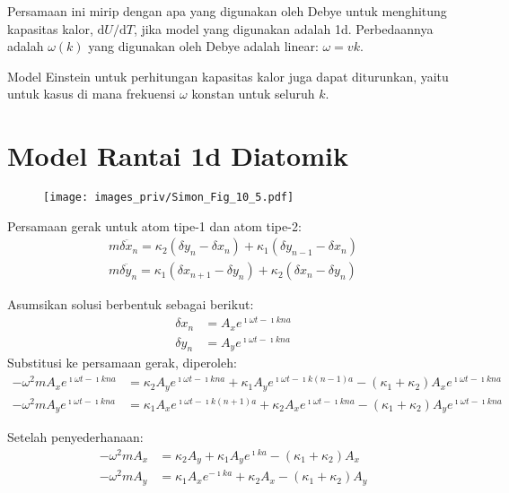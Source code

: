 Persamaan ini mirip dengan apa yang digunakan oleh Debye untuk
menghitung kapasitas kalor, $\mathrm{d}U/\mathrm{d}T$, jika model yang
digunakan adalah 1d. Perbedaannya adalah $\omega(k)$ yang digunakan
oleh Debye adalah linear: $\omega = vk$.

Model Einstein untuk perhitungan kapasitas kalor juga dapat diturunkan,
yaitu untuk kasus di mana frekuensi $\omega$ konstan untuk seluruh
$k$.


\section{Model Rantai 1d Diatomik}


\begin{figure}[h]
{\centering
\texttt{[image: images\_priv/Simon\_Fig\_10\_5.pdf]}
\par}
\end{figure}

Persamaan gerak untuk atom tipe-1 dan atom tipe-2:
\begin{align}
m \ddot{\delta x_{n}} = \kappa_{2} ( \delta y_{n} - \delta x_{n} ) +
\kappa_{1} ( \delta y_{n-1} - \delta x_{n} ) \\
m \ddot{\delta y_{n}} = \kappa_{1} ( \delta x_{n+1} - \delta y_{n} ) +
\kappa_{2} ( \delta x_{n} - \delta y_{n} )
\end{align}

Asumsikan solusi berbentuk sebagai berikut:
\begin{align}
\delta x_{n} & = A_{x} e^{\imath \omega t - \imath kna} \\
\delta y_{n} & = A_{y} e^{\imath \omega t - \imath kna}
\end{align}
Substitusi ke persamaan gerak, diperoleh:
\begin{align}
-\omega^2 m A_{x} e^{\imath \omega t - \imath kna} & =
\kappa_{2} A_{y} e^{\imath \omega t - \imath kna} +
\kappa_{1} A_{y} e^{\imath \omega t - \imath k(n-1)a} -
(\kappa_{1} + \kappa_{2}) A_{x} e^{\imath \omega t - \imath kna} \\
-\omega^2 m A_{y} e^{\imath \omega t - \imath kna} & =
\kappa_{1} A_{x} e^{\imath \omega t - \imath k(n+1)a} +
\kappa_{2} A_{x} e^{\imath \omega t - \imath kna} -
(\kappa_{1} + \kappa_{2}) A_{y} e^{\imath \omega t - \imath kna}
\end{align}

Setelah penyederhanaan:
\begin{align}
-\omega^2 m A_{x} & = \kappa_{2} A_{y} + \kappa_{1} A_{y} e^{\imath ka} -
(\kappa_{1} + \kappa_{2})A_{x} \\
-\omega^2 m A_{y} & = \kappa_{1} A_{x} e^{-\imath k a} + \kappa_{2} A_{x} -
(\kappa_{1} + \kappa_{2})A_{y}
\end{align}

